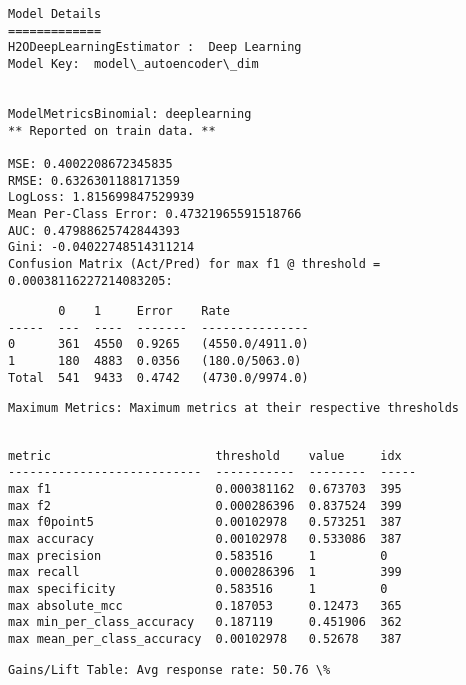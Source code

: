 \documentclass[11pt]{article}
\begin{document}
    \begin{Verbatim}[commandchars=\\\{\}]
Model Details
=============
H2ODeepLearningEstimator :  Deep Learning
Model Key:  model\_autoencoder\_dim


ModelMetricsBinomial: deeplearning
** Reported on train data. **

MSE: 0.4002208672345835
RMSE: 0.6326301188171359
LogLoss: 1.815699847529939
Mean Per-Class Error: 0.47321965591518766
AUC: 0.47988625742844393
Gini: -0.04022748514311214
Confusion Matrix (Act/Pred) for max f1 @ threshold = 0.00038116227214083205: 

    \end{Verbatim}

    
    \begin{verbatim}
       0    1     Error    Rate
-----  ---  ----  -------  ---------------
0      361  4550  0.9265   (4550.0/4911.0)
1      180  4883  0.0356   (180.0/5063.0)
Total  541  9433  0.4742   (4730.0/9974.0)
    \end{verbatim}

    
    \begin{Verbatim}[commandchars=\\\{\}]
Maximum Metrics: Maximum metrics at their respective thresholds


    \end{Verbatim}

    
    \begin{verbatim}
metric                       threshold    value     idx
---------------------------  -----------  --------  -----
max f1                       0.000381162  0.673703  395
max f2                       0.000286396  0.837524  399
max f0point5                 0.00102978   0.573251  387
max accuracy                 0.00102978   0.533086  387
max precision                0.583516     1         0
max recall                   0.000286396  1         399
max specificity              0.583516     1         0
max absolute_mcc             0.187053     0.12473   365
max min_per_class_accuracy   0.187119     0.451906  362
max mean_per_class_accuracy  0.00102978   0.52678   387
    \end{verbatim}

    
    \begin{Verbatim}[commandchars=\\\{\}]
Gains/Lift Table: Avg response rate: 50.76 \%


    \end{Verbatim}
\end{document}
